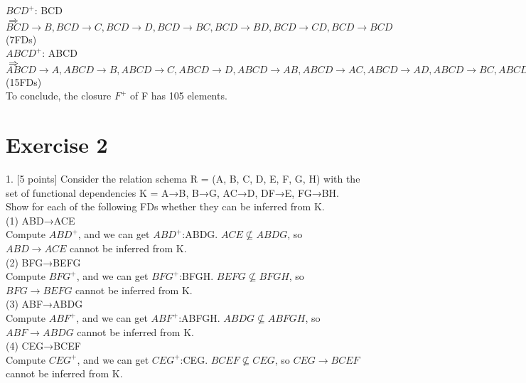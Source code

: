 \documentclass[]{article}
\begin{document}
	$BCD^{+}$: BCD  \\
	
	$\Longrightarrow$ $BCD\rightarrow B, BCD\rightarrow C, BCD\rightarrow D, BCD\rightarrow BC, BCD\rightarrow BD, BCD\rightarrow CD, BCD\rightarrow BCD$ (7FDs)  \\
	
	$ABCD^{+}$: ABCD  \\
	
	$\Longrightarrow$ $ABCD\rightarrow A, ABCD\rightarrow B, ABCD\rightarrow C, ABCD\rightarrow D, ABCD\rightarrow AB, ABCD\rightarrow AC, ABCD\rightarrow AD, ABCD\rightarrow BC, ABCD\rightarrow BD, ABCD\rightarrow CD, ABCD\rightarrow ABC, ABCD\rightarrow ABD, ABCD\rightarrow ACD, ABCD\rightarrow BCD, ABCD\rightarrow ABCD$ (15FDs)  \\
	
	\noindent To conclude, the closure $F^{+}$ of F has 105 elements. \\
	
	\section{Exercise 2}
	
	1. [5 points] Consider the relation schema R = (A, B, C, D, E, F, G, H) with the set of functional dependencies K = {A→B, B→G, AC→D, DF→E, FG→BH}. Show for each of the following FDs whether they can be inferred from K.   \\
	
	(1) ABD→ACE  \\
	
	Compute $ABD^{+}$, and we can get $ABD^{+}$:ABDG. $ACE\not\subseteq ABDG$, so $ABD\rightarrow ACE$ cannot be inferred from K.   \\
	
	(2) BFG→BEFG   \\
	
	Compute $BFG^{+}$, and we can get $BFG^{+}$:BFGH. $BEFG\not\subseteq BFGH$, so $BFG\rightarrow BEFG$ cannot be inferred from K.   \\
	
	(3) ABF→ABDG   \\
	
	Compute $ABF^{+}$, and we can get $ABF^{+}$:ABFGH. $ABDG\not\subseteq ABFGH$, so $ABF\rightarrow ABDG$ cannot be inferred from K.   \\
	
	(4) CEG→BCEF   \\
	
	Compute $CEG^{+}$, and we can get $CEG^{+}$:CEG. $BCEF\not\subseteq CEG$, so $CEG\rightarrow BCEF$ cannot be inferred from K.   \\
	
\end{document}
